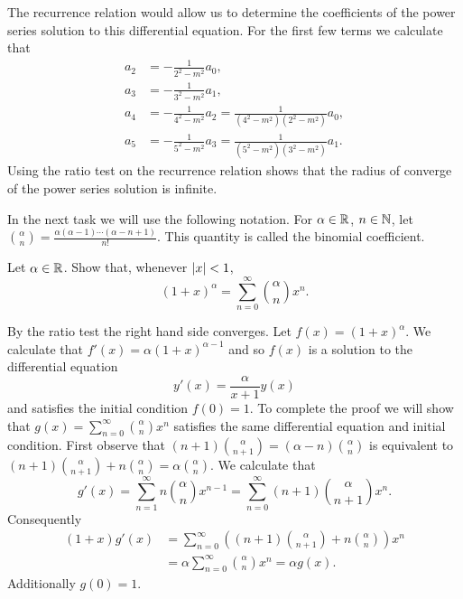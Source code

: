 \begin{solution}
$$    $$
    The recurrence relation would allow us to determine the coefficients of the power series solution to this differential equation.
    For the first few terms we calculate that
    $$
        \begin{aligned}
            a_2 & =  - \frac{1}{2^2 - m^2}a_{0},                                          \\
            a_3 & =  - \frac{1}{3^2 - m^2}a_{1},                                          \\
            a_4 & =  - \frac{1}{4^2 - m^2}a_{2} = \frac{1}{(4^2 - m^2)(2^2 - m^2)} a_{0}, \\
            a_5 & =  - \frac{1}{5^2 - m^2}a_{3} = \frac{1}{(5^2 - m^2)(3^2 - m^2)}a_{1}.
        \end{aligned}
    $$
    Using the ratio test on the recurrence relation shows that the radius of converge of the power series solution is infinite.
\end{solution}


In the next task we will use the following notation.
For \(\alpha \in \mathbb{R}\), \(n\in \mathbb{N}\), let
\(  \binom{\alpha}{n}= \frac{\alpha (\alpha-1) \cdots (\alpha-n+1)}{n!}\).
This quantity is called the binomial coefficient.

\begin{task}
    Let \(\alpha \in \mathbb{R}\).
    Show that, whenever \(\left|x\right|<1\),
    \[
        {(1+x)}^\alpha = \displaystyle\sum_{n=0}^{\infty} \textstyle\binom{\alpha}{n} x^n.
    \]
\end{task}

\begin{solution}
    By the ratio test the right hand side converges.
    Let \(f(x) = (1+x)^\alpha\).
    We calculate that \(f'(x) = \alpha(1+x)^{\alpha-1}\) and so \(f(x)\) is a solution to the differential equation
    \[
        y'(x) = \frac{\alpha}{x+1}y(x)
    \]
    and satisfies the initial condition \(f(0)=1\).
    To complete the proof we will show that 
    \(g(x) = \sum_{n=0}^{\infty} \binom{\alpha}{n} x^n\) satisfies the same differential equation and initial condition.
    First observe that 
    \( (n+1)\binom{\alpha}{n+1} = (\alpha - n)\binom{\alpha}{n} \) 
    is equivalent to 
    \( (n+1)\binom{\alpha}{n+1} + n \binom{\alpha}{n} = \alpha \binom{\alpha}{n}\).
    We calculate that 
    \[
        g'(x)
        =  \sum_{n=1}^{\infty} n \binom{\alpha}{n} x^{n-1}
        =  \sum_{n=0}^{\infty} (n+1) \binom{\alpha}{n+1} x^n.
    \]
    Consequently
    \[
        \begin{aligned}
            (1+x)g'(x)
             & = \sum_{n=0}^{\infty} \left( (n+1)\binom{\alpha}{n+1} + n\binom{\alpha}{n}    \right)  x^n \\
             & = \alpha  \sum_{n=0}^{\infty} \binom{\alpha}{n}  x^n = \alpha g(x).
        \end{aligned}
    \]
    Additionally \(g(0) = 1\).
\end{solution}


